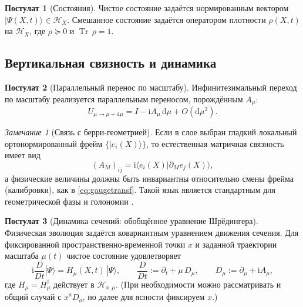 \documentclass[11pt,a4paper]{article}
\DeclareMathOperator{\Tr}{Tr}
\newcommand{\ii}{\mathrm{i}}
\newcommand{\dd}{\mathrm{d}}
\theoremstyle{definition}
\newtheorem{axiom}{Постулат}[section]
\theoremstyle{plain}
\theoremstyle{remark}
\newtheorem{remark}{Замечание}[section]
\begin{document}
\begin{axiom}[Состояния]\label{ax:states}
Чистое состояние задаётся нормированным вектором $|\Psi(X,t)\rangle\in\mathcal H_{X}$.
Смешанное состояние задаётся оператором плотности $\rho(X,t)$ на $\mathcal H_{X}$, где $\rho\succeq 0$ и $\Tr\,\rho=1$.
\end{axiom}

\subsection{Вертикальная связность и динамика}
\label{sec:axioms:dynamics}

\begin{axiom}[Параллельный перенос по масштабу]\label{ax:verticaltransport}
Инфинитезимальный переход по масштабу реализуется параллельным переносом, порождённым $A_\mu$:
\begin{equation}\label{eq:Uinf}
U_{\mu\to\mu+\dd\mu} = I - \ii A_\mu\,\dd\mu + O(\dd\mu^2).
\end{equation}
\end{axiom}

\begin{remark}[Связь с берри-геометрией]\label{rem:berry}
Если в слое выбран гладкий локальный ортонормированный фрейм $\{|e_i(X)\rangle\}$, то естественная матричная связность имеет вид
\begin{equation}\label{eq:berryA}
(A_M)_{ij} = \ii\langle e_i(X)|\partial_M e_j(X)\rangle,
\end{equation}
а физические величины должны быть инвариантны относительно смены фрейма (калибровки), как в \eqref{eq:gaugetransf}.
Такой язык является стандартным для геометрической фазы и голономии \cite{Berry1984QuantalPhase,Simon1983HolonomyBerry}.
\end{remark}

\begin{axiom}[Динамика сечений: обобщённое уравнение Шрёдингера]\label{ax:genSchr}
Физическая эволюция задаётся ковариантным уравнением движения сечения.
Для фиксированной пространственно-временной точки $x$ и заданной траектории масштаба $\mu(t)$ чистое состояние удовлетворяет
\begin{equation}\label{eq:genSchr}
\ii\frac{D}{Dt}|\Psi\rangle = H_\mu(X,t)\,|\Psi\rangle,
\qquad
\frac{D}{Dt} := \partial_t + \dot{\mu}\,D_\mu,
\qquad
D_\mu := \partial_\mu + \ii A_\mu,
\end{equation}
где $H_\mu=H_\mu^\dagger$ действует в $\mathcal H_{x,\mu}$.
(При необходимости можно рассматривать и общий случай с $\dot x^a D_a$, но далее для ясности фиксируем $x$.)
\end{axiom}
\end{document}
